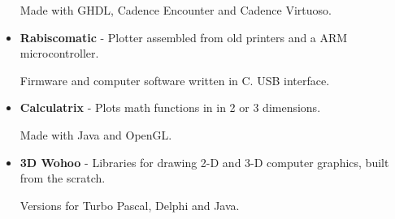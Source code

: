 \documentclass[a4paper,10pt]{article}
\begin{document}
\begin{itemize}
        Made with GHDL, Cadence Encounter and Cadence Virtuoso.

      \item 
        \textbf{Rabiscomatic} - Plotter assembled from old printers and a ARM microcontroller.

        Firmware and computer software written in C. USB interface.

      \item 
        \textbf{Calculatrix} - Plots math functions in in 2 or 3 dimensions.

        Made with Java and OpenGL.

      \item 
        \textbf{3D Wohoo} - Libraries for drawing 2-D and 3-D computer graphics, built from the scratch.

        Versions for Turbo Pascal, Delphi and Java.
    \end{itemize}
\end{document}
